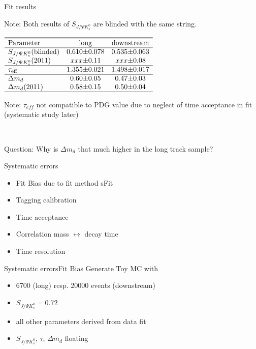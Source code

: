 \documentclass{beamer}
\newcommand{\SJPsi}{S_{J/\Psi K_s^0}}
\begin{document}
	\begin{frame}{Fit results}
	\begin{alert}{Note:}
	Both results of $\SJPsi$ are blinded with the same string.
	\end{alert}
	\begin{center}
	$\begin{array}{l r@{\pm}l r@{\pm}l}
	\hline \hline
	\text{Parameter} & \multicolumn{2}{c}{\text{long}} & \multicolumn{2}{c}{\text{downstream}}\\ \hline
	\SJPsi (\text{blinded}) & 0.610 & 0.078 & 0.535 & 0.063 \\
	\SJPsi (2011)           & xxx   & 0.11  & xxx   & 0.08  \\ \hline
	\tau_{\text{eff}}       & 1.355 & 0.021 & 1.498 & 0.017 \\ \hline
	\Delta m_d         & 0.60 & 0.05 & 0.47 & 0.03 \\
    \Delta m_d (2011)  & 0.58 & 0.15 & 0.50 & 0.04 \\
	\hline
	\end{array}$
	\end{center}
    \begin{alert}{Note:}
	$\tau_{eff}$ not compatible to PDG value due to neglect of time acceptance in fit (systematic study later)
	\end{alert} \\
	\begin{alert}{Question:}
	Why is $\Delta m_d$ that much higher in the long track sample?
	\end{alert}
	\end{frame}

	
	\begin{frame}{Systematic errors}
	\begin{itemize}
		\item Fit Bias due to fit method sFit
	    \item Tagging calibration
	    \item Time acceptance
	    \item Correlation mass $\leftrightarrow$ decay time
	    \item Time resolution
	\end{itemize}
	\end{frame}
	
	\begin{frame}{Systematic errors}{Fit Bias}
	Generate Toy MC with 
	\begin{itemize}
	\item 6700 (long) resp. 20000 events (downstream)
	\item $\SJPsi = 0.72$ 
	\item all other parameters derived from data fit
	\item $\SJPsi$, $\tau$, $\Delta m_d$ floating
	\end{itemize}
    \end{frame}	
	
\end{document}
